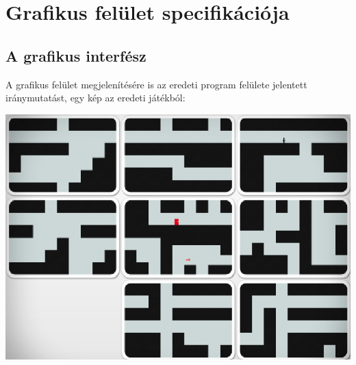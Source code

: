 

\usepackage{enumitem}
\usepackage{textcomp}
\usepackage[utf8]{inputenc}
\usepackage[T1]{fontenc}



\fedlap

\addtocounter{section}{10}
\section{Grafikus felület specifikációja}

	\subsection{A grafikus interfész}
	A grafikus felület megjelenítésére is az eredeti program felülete jelentett iránymutatást, egy kép az eredeti játékból:
	\begin{center}
		    \includegraphics[scale=0.7]{resources/gui_original.png}
	  \end{center}
	

